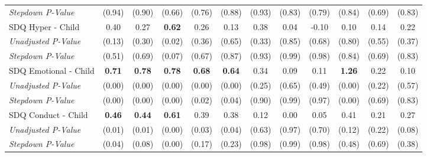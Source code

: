\begin{tabular}{l c c c c c c c c c c c}
\quad \textit{Stepdown P-Value} & (0.94) & (0.90) & (0.66) & (0.76) & (0.88) & (0.93) & (0.83) & (0.79) & (0.84) & (0.69) & (0.83) \\
SDQ Hyper - Child & 0.40 & 0.27 & \textbf{ 0.62 } & 0.26 & 0.13 & 0.38 & 0.04 & -0.10 & 0.10 & 0.14 & 0.22 \\
\quad \textit{Unadjusted P-Value} & (0.13) & (0.30) & (0.02) & (0.36) & (0.65) & (0.33) & (0.85) & (0.68) & (0.80) & (0.55) & (0.37) \\
\quad \textit{Stepdown P-Value} & (0.51) & (0.69) & (0.07) & (0.67) & (0.87) & (0.93) & (0.99) & (0.98) & (0.84) & (0.69) & (0.83) \\
SDQ Emotional - Child & \textbf{ 0.71 } & \textbf{ 0.78 } & \textbf{ 0.78 } & \textbf{ 0.68 } & \textbf{ 0.64 } & 0.34 & 0.09 & 0.11 & \textbf{ 1.26 } & 0.22 & 0.10 \\
\quad \textit{Unadjusted P-Value} & (0.00) & (0.00) & (0.00) & (0.00) & (0.00) & (0.25) & (0.65) & (0.49) & (0.00) & (0.22) & (0.57) \\
\quad \textit{Stepdown P-Value} & (0.00) & (0.00) & (0.00) & (0.02) & (0.04) & (0.90) & (0.99) & (0.97) & (0.00) & (0.69) & (0.83) \\
SDQ Conduct - Child & \textbf{ 0.46 } & \textbf{ 0.44 } & \textbf{ 0.61 } & 0.39 & 0.38 & 0.12 & 0.00 & 0.05 & 0.41 & 0.21 & 0.27 \\
\quad \textit{Unadjusted P-Value} & (0.01) & (0.01) & (0.00) & (0.03) & (0.04) & (0.63) & (0.97) & (0.70) & (0.12) & (0.22) & (0.08) \\
\quad \textit{Stepdown P-Value} & (0.04) & (0.08) & (0.00) & (0.17) & (0.23) & (0.98) & (0.99) & (0.98) & (0.48) & (0.69) & (0.38) \\
\bottomrule
\end{tabular}
